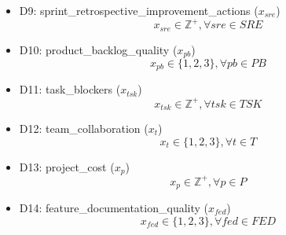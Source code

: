 \documentclass{article}
\begin{document}
\begin{itemize}
\begin{equation*}
        \end{equation*}
    \item D9: sprint\_retrospective\_improvement\_actions ($x_{sre}$)
        \begin{equation*}
            x_{sre} \in \mathbb{Z}^{+}, \forall sre \in SRE
        \end{equation*}
    \item D10: product\_backlog\_quality ($x_{pb}$)
        \begin{equation*}
            x_{pb} \in \{1, 2, 3\}, \forall pb \in PB
        \end{equation*}
    \item D11: task\_blockers ($x_{tsk}$)
        \begin{equation*}
            x_{tsk} \in \mathbb{Z}^{+}, \forall tsk \in TSK
        \end{equation*}
    \item D12: team\_collaboration ($x_{t}$)
        \begin{equation*}
            x_{t} \in \{1, 2, 3\}, \forall t \in T
        \end{equation*}
    \item D13: project\_cost ($x_{p}$)
        \begin{equation*}
            x_{p} \in \mathbb{Z}^{+}, \forall p \in P
        \end{equation*}
    \item D14: feature\_documentation\_quality ($x_{fed}$)
        \begin{equation*}
            x_{fed} \in \{1, 2, 3\}, \forall fed \in FED
        \end{equation*}
\end{itemize}
\end{document}

